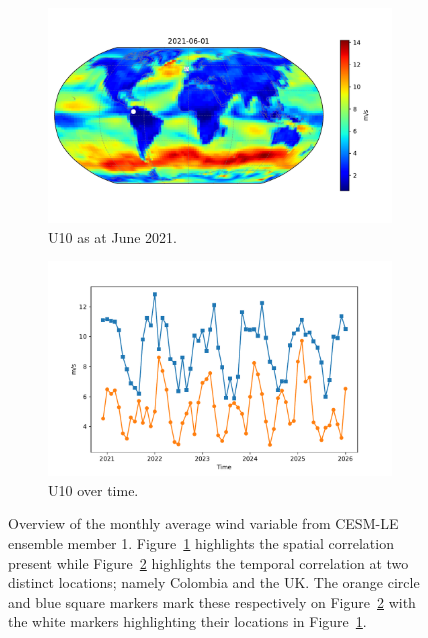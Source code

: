\begin{figure}[htbp!] 
	\centering
	\begin{subfigure}[b]{0.45\textwidth}
		\includegraphics[width=\textwidth]{U10_example}
		\caption{U10 as at June 2021.}
		\label{fig:wind_june}   
	\end{subfigure}             
	\begin{subfigure}[b]{0.45\textwidth}
		\includegraphics[width=\textwidth]{U10_example_temp}
		\caption{U10 over time.}
		\label{fig:wind_temp}
	\end{subfigure}             
	\caption[Overview of Wind variable]{Overview of the monthly average wind variable from CESM-LE ensemble member 1. Figure~\ref{fig:wind_june} highlights the spatial correlation present while Figure~\ref{fig:wind_temp} highlights the temporal correlation at two distinct locations; namely Colombia and the UK. The orange circle and blue square markers mark these respectively on Figure~\ref{fig:wind_temp} with the white markers highlighting their locations in Figure~\ref{fig:wind_june}.}
	\label{fig:wind_overview}
\end{figure}

